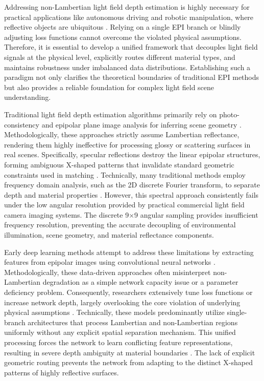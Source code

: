 \documentclass[lettersize,journal]{IEEEtran}
\begin{document}
Addressing non-Lambertian light field depth estimation is highly necessary for practical applications like autonomous driving and robotic manipulation, where reflective objects are ubiquitous \cite{autonomous_driving, robotic_manipulation}. Relying on a single EPI branch or blindly adjusting loss functions cannot overcome the violated physical assumptions. Therefore, it is essential to develop a unified framework that decouples light field signals at the physical level, explicitly routes different material types, and maintains robustness under imbalanced data distributions. Establishing such a paradigm not only clarifies the theoretical boundaries of traditional EPI methods but also provides a reliable foundation for complex light field scene understanding.

Traditional light field depth estimation algorithms primarily rely on photo-consistency and epipolar plane image analysis for inferring scene geometry \cite{traditional_lf_depth, epi_analysis}. Methodologically, these approaches strictly assume Lambertian reflectance, rendering them highly ineffective for processing glossy or scattering surfaces in real scenes. Specifically, specular reflections destroy the linear epipolar structures, forming ambiguous X-shaped patterns that invalidate standard geometric constraints used in matching \cite{x_shaped_patterns, geometric_constraints}. Technically, many traditional methods employ frequency domain analysis, such as the 2D discrete Fourier transform, to separate depth and material properties \cite{2d_dft, frequency_analysis}. However, this spectral approach consistently fails under the low angular resolution provided by practical commercial light field camera imaging systems. The discrete 9$\times$9 angular sampling provides insufficient frequency resolution, preventing the accurate decoupling of environmental illumination, scene geometry, and material reflectance components.

Early deep learning methods attempt to address these limitations by extracting features from epipolar images using convolutional neural networks \cite{early_dl_lf, cnn_epi}. Methodologically, these data-driven approaches often misinterpret non-Lambertian degradation as a simple network capacity issue or a parameter deficiency problem. Consequently, researchers extensively tune loss functions or increase network depth, largely overlooking the core violation of underlying physical assumptions \cite{loss_function_tuning, physical_assumptions}. Technically, these models predominantly utilize single-branch architectures that process Lambertian and non-Lambertian regions uniformly without any explicit spatial separation mechanism. This unified processing forces the network to learn conflicting feature representations, resulting in severe depth ambiguity at material boundaries \cite{single_branch_architecture, depth_ambiguity}. The lack of explicit geometric routing prevents the network from adapting to the distinct X-shaped patterns of highly reflective surfaces.
\end{document}
